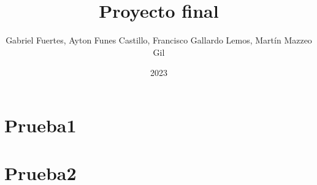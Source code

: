 \documentclass{report}
\title{Proyecto final}
\author{Gabriel Fuertes, Ayton Funes Castillo, Francisco Gallardo Lemos, Martín Mazzeo Gil}
\date{2023}
\begin{document}



\tableofcontents
\listoffigures
\listoftables

\cleardoublepage



\section{Prueba1}
\section{Prueba2}
\end{document}
